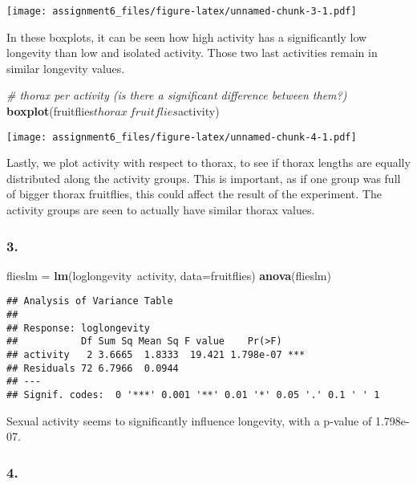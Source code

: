 \documentclass[11pt,]{article}
\newenvironment{Shaded}{\begin{snugshade}}{\end{snugshade}}
\newcommand{\KeywordTok}[1]{\textcolor[rgb]{0.13,0.29,0.53}{\textbf{{#1}}}}
\newcommand{\DataTypeTok}[1]{\textcolor[rgb]{0.13,0.29,0.53}{{#1}}}
\newcommand{\StringTok}[1]{\textcolor[rgb]{0.31,0.60,0.02}{{#1}}}
\newcommand{\CommentTok}[1]{\textcolor[rgb]{0.56,0.35,0.01}{\textit{{#1}}}}
\newcommand{\NormalTok}[1]{{#1}}
\begin{document}
\texttt{[image: assignment6\_files/figure-latex/unnamed-chunk-3-1.pdf]}

In these boxplots, it can be seen how high activity has a significantly
low longevity than low and isolated activity. Those two last activities
remain in similar longevity values.

\begin{Shaded}
\begin{Highlighting}[]
\CommentTok{# thorax per activity (is there a significant difference between them?)}
\KeywordTok{boxplot}\NormalTok{(fruitflies$thorax~fruitflies$activity)}
\end{Highlighting}
\end{Shaded}

\texttt{[image: assignment6\_files/figure-latex/unnamed-chunk-4-1.pdf]}

Lastly, we plot activity with respect to thorax, to see if thorax
lengths are equally distributed along the activity groups. This is
important, as if one group was full of bigger thorax fruitflies, this
could affect the result of the experiment. The activity groups are seen
to actually have similar thorax values.

\subsubsection{3.}\label{section-1}

\begin{Shaded}
\begin{Highlighting}[]
\NormalTok{flieslm =}\StringTok{ }\KeywordTok{lm}\NormalTok{(loglongevity~activity, }\DataTypeTok{data=}\NormalTok{fruitflies)}
\KeywordTok{anova}\NormalTok{(flieslm)}
\end{Highlighting}
\end{Shaded}

\begin{verbatim}
## Analysis of Variance Table
## 
## Response: loglongevity
##           Df Sum Sq Mean Sq F value    Pr(>F)    
## activity   2 3.6665  1.8333  19.421 1.798e-07 ***
## Residuals 72 6.7966  0.0944                      
## ---
## Signif. codes:  0 '***' 0.001 '**' 0.01 '*' 0.05 '.' 0.1 ' ' 1
\end{verbatim}

Sexual activity seems to significantly influence longevity, with a
p-value of 1.798e-07.

\subsubsection{4.}\label{section-2}
\end{document}
